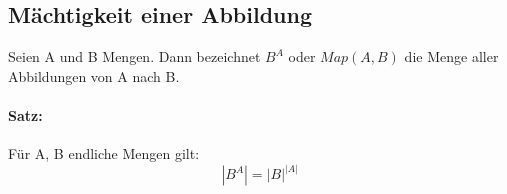 \subsection{Mächtigkeit einer Abbildung}
Seien A und B Mengen.
Dann bezeichnet $B^A$ oder $Map(A,B)$ die Menge aller Abbildungen von A nach B.
\paragraph*{Satz:}
Für A, B endliche Mengen gilt:
$$ |B^A| = {|B|}^{|A|} $$
